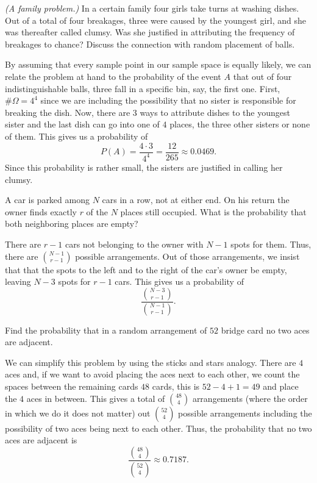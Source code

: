 \begin{problem}[Handout 2, \# 14]
  \emph{(A family problem.)} In a certain family four girls take turns at
  washing dishes. Out of a total of four breakages, three were caused by
  the youngest girl, and she was thereafter called clumsy. Was she
  justified in attributing the frequency of breakages to chance? Discuss
  the connection with random placement of balls.
\end{problem}
\begin{solution}
  By assuming that every sample point in our sample space is equally
  likely, we can relate the problem at hand to the probability of the event
  \(A\) that out of four indistinguishable balls, three fall in a specific
  bin, say, the first one. First, \(\#\Omega=4^4\) since we are including
  the possibility that no sister is responsible for breaking the dish. Now,
  there are \(3\) ways to attribute dishes to the youngest sister and the
  last dish can go into one of \(4\) places, the three other sisters or
  none of them. This gives us a probability of
  \[
    P(A)=\frac{4\cdot 3}{4^4}=\frac{12}{265}\approx 0.0469.
  \]
  Since this probability is rather small, the sisters are justified in
  calling her clumsy.
\end{solution}
\newpage

\begin{problem}[Handout 2, \# 15]
  A car is parked among \(N\) cars in a row, not at either end. On his
  return the owner finds exactly \(r\) of the \(N\) places still
  occupied. What is the probability that both neighboring places are empty?
\end{problem}
\begin{solution}
  There are \(r-1\) cars not belonging to the owner with \(N-1\) spots for
  them. Thus, there are \(\displaystyle \binom{N-1}{r-1}\) possible
  arrangements. Out of those arrangements, we insist that that the spots to
  the left and to the right of the car's owner be empty, leaving \(N-3\)
  spots for \(r-1\) cars. This gives us a probability of
  \[
    \frac{\displaystyle\binom{N-3}{r-1}}{\displaystyle\binom{N-1}{r-1}}.
  \]
\end{solution}
\newpage

\begin{problem}[Handout 2, \# 16]
  Find the probability that in a random arrangement of \(52\) bridge card
  no two aces are adjacent.
\end{problem}
\begin{solution}
  We can simplify this problem by using the sticks and stars analogy. There
  are \(4\) aces and, if we want to avoid placing the aces next to each
  other, we count the spaces between the remaining cards \(48\) cards, this
  is \(52-4+1=49\) and place the \(4\) aces in between. This gives a total
  of \(\displaystyle\binom{48}{4}\) arrangements (where the order in which
  we do it does not matter) out \(\displaystyle\binom{52}{4}\) possible
  arrangements including the possibility of two aces being next to each
  other. Thus, the probability that no two aces are adjacent is
  \[
    \frac{\displaystyle \binom{48}{4}}{\displaystyle \binom{52}{4}}\approx 0.7187.
  \]
\end{solution}
\newpage

